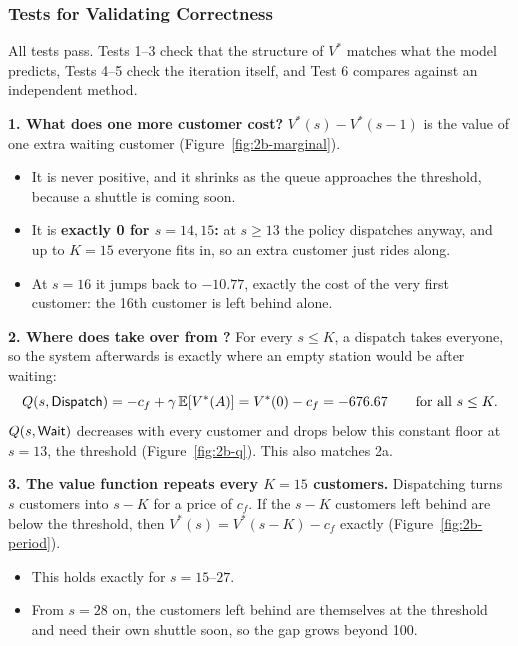 \subsubsection{Tests for Validating Correctness}

All tests pass. Tests 1--3 check that the structure of $V^*$ matches what the model predicts, Tests 4--5 check the iteration itself, and Test 6 compares against an independent method.

\textbf{1. What does one more customer cost?} $V^*(s) - V^*(s-1)$ is the value of one extra waiting customer (Figure~\ref{fig:2b-marginal}).
\begin{itemize}
  \item It is never positive, and it shrinks as the queue approaches the threshold, because a shuttle is coming soon.
  \item It is \textbf{exactly 0 for $s = 14, 15$:} at $s \geq 13$ the policy dispatches anyway, and up to $K = 15$ everyone fits in, so an extra customer just rides along.
  \item At $s = 16$ it jumps back to $-10.77$, exactly the cost of the very first customer: the 16th customer is left behind alone.
\end{itemize}


\textbf{2. Where does  take over from ?} For every $s \leq K$, a dispatch takes everyone, so the system afterwards is exactly where an empty station would be after waiting:
\[
  Q(s, \textsf{Dispatch}) = -c_f + \gamma\,\mathbb{E}[V^*(A)] = V^*(0) - c_f = -676.67 \qquad \text{for all } s \leq K.
\]
$Q(s, \textsf{Wait})$ decreases with every customer and drops below this constant floor at $s = 13$, the threshold (Figure~\ref{fig:2b-q}). This also matches 2a.


\textbf{3. The value function repeats every $K = 15$ customers.} Dispatching turns $s$ customers into $s - K$ for a price of $c_f$. If the $s - K$ customers left behind are below the threshold, then $V^*(s) = V^*(s - K) - c_f$ exactly (Figure~\ref{fig:2b-period}).
\begin{itemize}
  \item This holds exactly for $s = 15$--$27$.
  \item From $s = 28$ on, the customers left behind are themselves at the threshold and need their own shuttle soon, so the gap grows beyond 100.
\end{itemize}

